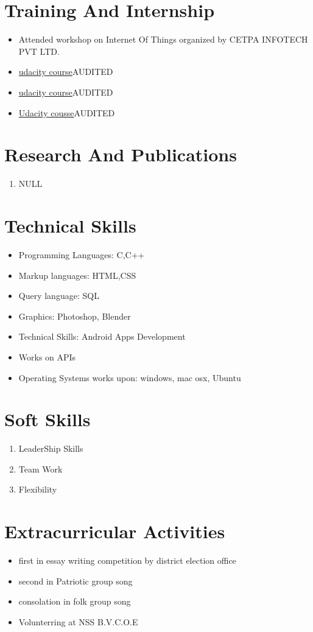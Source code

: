 \documentclass{article}
\begin{document}
	\section{Training And Internship}
		\begin{itemize}
			\item {Attended workshop on Internet Of Things organized by CETPA INFOTECH PVT LTD.}
			\item \href{https://classroom.udacity.com/courses/ud836}{udacity course}{AUDITED}
			\item \href{https://classroom.udacity.com/courses/ud839}{udacity course}{AUDITED}
			\item \href{https://classroom.udacity.com/courses/ud834}{Udacity cousse}{AUDITED}
		\end{itemize}
	\section{Research And Publications}
		\begin{enumerate}
			\item {NULL}
		\end{enumerate}
	\section{Technical Skills}
		\begin{itemize}
			\item {Programming Languages: C,C++}
			\item {Markup languages: HTML,CSS}
			\item {Query language: SQL}
			\item {Graphics: Photoshop, Blender}
			\item {Technical Skills: Android Apps Development}
			\item {Works on APIs}
			\item {Operating Systems works upon: windows, mac osx, Ubuntu}
		\end{itemize}
	\section{Soft Skills}
		\begin{enumerate}
			\item {LeaderShip Skills}
			\item {Team Work}
			\item {Flexibility}
		\end{enumerate}
	\section{Extracurricular Activities}
		\begin{itemize}
			\item { first in essay writing competition by district election office }
			\item { second in Patriotic group song}
			\item { consolation in folk group song}
			\item { Volunterring at NSS B.V.C.O.E}
		\end{itemize}
\end{document}

